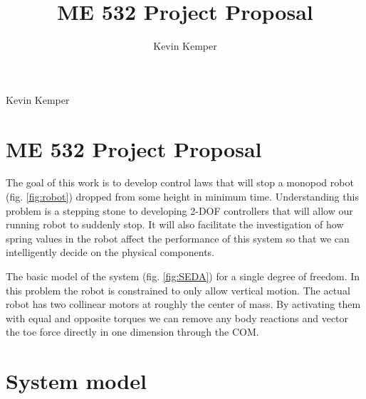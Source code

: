 \documentclass[letterpaper, 12 pt]{article}  %
\title{\LARGE \bf
ME 532 Project Proposal
}
\author{ \parbox{3 in}{\centering Kevin Kemper}}
\begin{document}
\begin{flushright}
Kevin Kemper
\end{flushright}

\thispagestyle{empty}
\pagestyle{empty}






\section{ME 532 Project Proposal}


The goal of this work is to develop control laws that will stop a monopod robot (fig. \ref{fig:robot})
dropped from some height in minimum time.  Understanding this problem is a stepping
stone to developing 2-DOF controllers that will allow our running robot to suddenly stop.
It will also facilitate the investigation of how spring values in the robot affect
the performance of this system so that we can intelligently decide on the physical
components.

The basic model of the system (fig. \ref{fig:SEDA}) for a single degree of freedom.
In this problem the robot is constrained to only allow vertical motion.  The actual
robot has two collinear motors at roughly the center of mass.  By activating them
with equal and opposite torques we can remove any body reactions and vector the
toe force directly in one dimension through the COM.

\section{System model}
	
\end{document}
